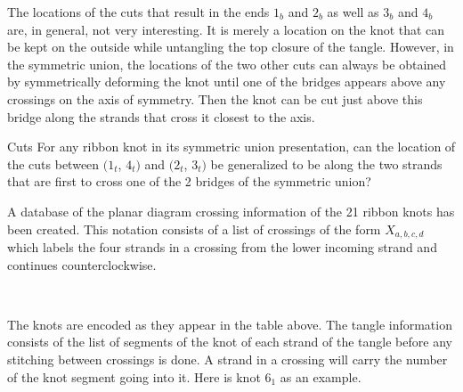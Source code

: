 \begin{paper}
The locations of the cuts that result in the ends $1_b$ and $2_b$ as well as
$3_b$ and $4_b$ are, in general, not very interesting.
It is merely a location on the knot that can be kept on the outside while
untangling the top closure of the tangle.
However, in the symmetric union, the locations of the two other cuts can always
be obtained by symmetrically deforming the knot until one of the bridges appears
above any crossings on the axis of symmetry.
Then the knot can be cut just above this bridge along the strands that cross it
closest to the axis.

\newsavebox{\mirrorR}


\begin{paperquestion}{Cuts}
For any ribbon knot in its symmetric union presentation, can the location of the
cuts between $(1_t$, $4_t)$ and $(2_t$, $3_t)$ be generalized to be along the
two strands that are first to cross one of the 2 bridges of the symmetric union?
\end{paperquestion}

A database of the planar diagram crossing information of the 21 ribbon
knots has been created.
This notation consists of a list of crossings of the form $X_{a,b,c,d}$ which
labels the four strands in a crossing from the lower incoming strand and
continues counterclockwise.

~~~~~~~~~~~
\vspace{12pt}

The knots are encoded as they appear in the table above.
The tangle information consists of the list of segments of the knot of each
strand of the tangle before any stitching between crossings is done.
A strand in a crossing will carry the number of the knot segment going into it.
Here is knot $6_1$ as an example.


\end{paper}

